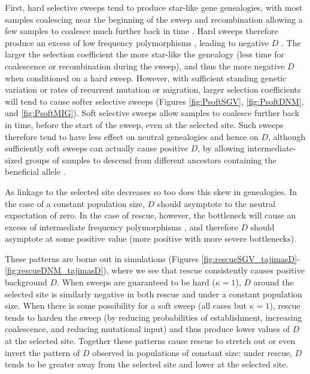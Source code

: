 \documentclass[]{article}
\begin{document}
First, hard selective sweeps tend to produce star-like gene genealogies, with most samples coalescing near the beginning of the sweep and recombination allowing a few samples to coalesce much further back in time \citep{kaplan1989hitchhiking}.
Hard sweeps therefore produce an excess of low frequency polymorphisms \citep[][p.\ 120]{wakeley2009coalescent}, leading to negative $D$ \citep{braverman1995hitchhiking}.
The larger the selection coefficient the more star-like the genealogy (less time for coalescence or recombination during the sweep), and thus the more negative $D$ when conditioned on a hard sweep.
However, with sufficient standing genetic variation or rates of recurrent mutation or migration, larger selection coefficients will tend to cause softer selective sweeps (Figures \ref{fig:PsoftSGV}, \ref{fig:PsoftDNM}, and \ref{fig:PsoftMIG}).
Soft selective sweeps allow samples to coalesce further back in time, before the start of the sweep, even at the selected site.
Such sweeps therefore tend to have less effect on neutral genealogies and hence on $D$, although sufficiently soft sweeps can actually cause positive $D$, by allowing intermediate-sized groups of samples to descend from different ancestors containing the beneficial allele \citep{pennings2006soft}.

As linkage to the selected site decreases so too does this skew in genealogies.
In the case of a constant population size, $D$ should asymptote to the neutral expectation of zero.
In the case of rescue, however, the bottleneck will cause an excess of intermediate frequency polymorphisms \citep[][p.\ 120]{wakeley2009coalescent}, and therefore $D$ should asymptote at some positive value (more positive with more severe bottlenecks).
 
These patterns are borne out in simulations (Figures \ref{fig:rescueSGV_tajimasD}-\ref{fig:rescueDNM_tajimasD}), where we see that rescue consistently causes positive background $D$.
When sweeps are guaranteed to be hard ($\kappa=1$), $D$ around the selected site is similarly negative in both rescue and under a constant population size.
When there is some possibility for a soft sweep (all cases but $\kappa=1$), rescue tends to harden the sweep (by reducing probabilities of establishment, increasing coalescence, and reducing mutational input) and thus produce lower values of $D$ at the selected site.
Together these patterns cause rescue to stretch out or even invert the pattern of $D$ observed in populations of constant size: under rescue, $D$ tends to be greater away from the selected site and lower at the selected site.
\end{document}
